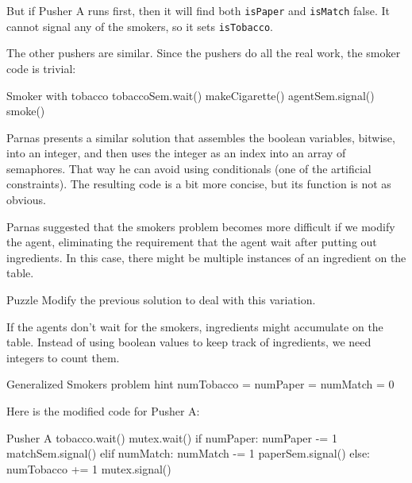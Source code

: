 But if Pusher A runs first, then it will find both
{\tt isPaper} and {\tt isMatch} false.  It cannot signal
any of the smokers, so it sets {\tt isTobacco}.

The other pushers are similar.  Since the pushers do all
the real work, the smoker code is trivial:

\begin{lstbox}{Smoker with tobacco}
tobaccoSem.wait()
makeCigarette()
agentSem.signal()
smoke()
\end{lstbox}

Parnas presents a similar solution that assembles the
boolean variables, bitwise, into an integer, and then
uses the integer as an index into an array of semaphores.
That way he can avoid using conditionals (one of the
artificial constraints).  The resulting code is a bit
more concise, but its function is not as obvious.


\blankpage
{}

Parnas suggested that the smokers problem becomes more
difficult if we modify the agent, eliminating the requirement
that the agent wait after putting out ingredients.  In this
case, there might be multiple instances of an ingredient on
the table.

\begin{puzzlebox}{Puzzle}
Modify the previous solution to deal with this
variation.


If the agents don't wait for the smokers, ingredients might
accumulate on the table.  Instead of using boolean values to
keep track of ingredients, we need integers to count them.

\begin{lstbox}{Generalized Smokers problem hint}
numTobacco = numPaper = numMatch = 0
\end{lstbox}
\end{puzzlebox}


\label{smoker}

Here is the modified code for Pusher A:

\begin{lstbox}{Pusher A}
tobacco.wait()
mutex.wait()
    if numPaper:
        numPaper -= 1
        matchSem.signal()
    elif numMatch:
        numMatch -= 1
        paperSem.signal()
    else: 
        numTobacco += 1
mutex.signal()
\end{lstbox}

